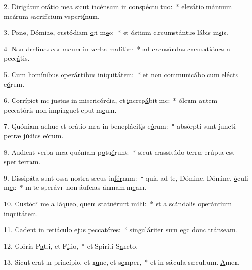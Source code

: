 2. Dirigátur orátio mea sicut incénsum in consp\uline{é}ctu t\uline{u}o:~* elevátio mánuum meárum sacrifícium vspert\uline{í}num.\par 
3. Pone, Dómine, custódiam \uline{o}ri m\uline{e}o:~* et óstium circumstántiæ lábis m\uline{e}is.\par 
4. Non declínes cor meum in v\uline{e}rba mal\uline{í}tiæ:~* ad excusándas excusatiónes n pecc\uline{á}tis.\par 
5. Cum homínibus operántibus in\uline{i}quit\uline{á}tem:~* et non communicábo cum elécts e\uline{ó}rum.\par 
6. Corrípiet me justus in misericórdia, et \uline{i}ncrep\uline{á}bit me:~* óleum autem peccatóris non impínguet cput m\uline{e}um.\par 
7. Quóniam adhuc et orátio mea in beneplácit\uline{i}s e\uline{ó}rum:~* absórpti sunt juncti petræ júdics e\uline{ó}rum.\par 
8. Audient verba mea quóniam p\uline{o}tu\uline{é}runt:~* sicut crassitúdo terræ erúpta est sper t\uline{e}rram.\par 
9. Dissipáta sunt ossa nostra secus in\uline{fér}num:~† quia ad te, Dómine, Dómine, \uline{ó}culi m\uline{e}i:~* in te sperávi, non áuferas ánmam m\uline{e}am.\par 
10. Custódi me a láqueo, quem statu\uline{é}runt m\uline{i}hi:~* et a scándalis operántium inquit\uline{á}tem.\par 
11. Cadent in retiáculo ejus p\uline{e}ccat\uline{ó}res:~* singuláriter sum ego donc tráns\uline{e}am.\par 
12. Glória P\uline{a}tri, et F\uline{í}lio,~* et Spiríti S\uline{a}ncto.\par 
13. Sicut erat in princípio, et n\uline{u}nc, et s\uline{e}mper,~* et in sǽcula sæculrum. \uline{A}men.\par 
